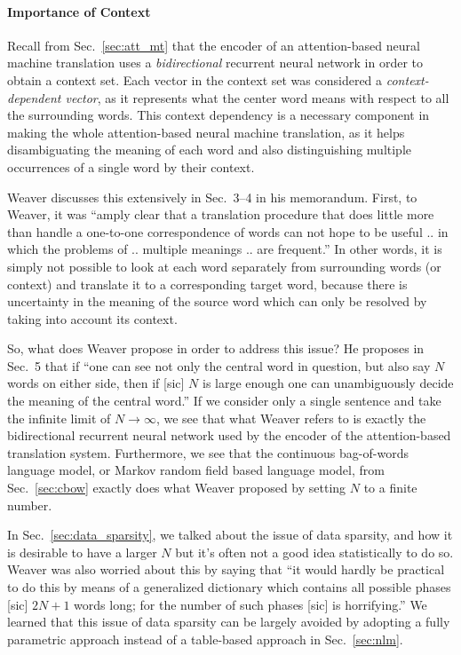 \documentclass{report}
\begin{document}
\paragraph{Importance of Context}

Recall from Sec.~\ref{sec:att_mt} that the encoder of an attention-based neural
machine translation uses a {\em bidirectional} recurrent neural network in order
to obtain a context set. Each vector in the context set was considered a {\em
context-dependent vector}, as it represents what the center word means with
respect to all the surrounding words. This context dependency is a necessary
component in making the whole attention-based neural machine translation, as it
helps disambiguating the meaning of each word and also distinguishing multiple
occurrences of a single word by their context.

Weaver discusses this extensively in Sec.~3--4 in his memorandum. First, to
Weaver, it was ``amply clear that a translation procedure that does little more
than handle a one-to-one correspondence of words can not hope to be useful .. in
which the problems of .. multiple meanings .. are frequent.'' In other words, it
is simply not possible to look at each word separately from surrounding words
(or context) and translate it to a corresponding target word, because there is
uncertainty in the meaning of the source word which can only be resolved by
taking into account its context.

So, what does Weaver propose in order to address this issue? He proposes in
Sec.~5 that if ``one can see not only the central word in question, but also say
$N$ words on either side, then if [sic] $N$ is large enough one can
unambiguously decide the meaning of the central word.'' If we consider only a
single sentence and take the infinite limit of $N \to \infty$, we see that what
Weaver refers to is exactly the bidirectional recurrent neural network used by
the encoder of the attention-based translation system.  Furthermore, we see that
the continuous bag-of-words language model, or Markov random field based
language model, from Sec.~\ref{sec:cbow} exactly does what Weaver proposed by
setting $N$ to a finite number.

In Sec.~\ref{sec:data_sparsity}, we talked about the issue of data sparsity, and
how it is desirable to have a larger $N$ but it's often not a good idea
statistically to do so. Weaver was also worried about this by saying that ``it
would hardly be practical to do this by means of a generalized dictionary which
contains all possible phases [sic] $2N+1$ words long; for the number of such
phases [sic] is horrifying.'' We learned that this issue of data sparsity can be
largely avoided by adopting a fully parametric approach instead of a
table-based approach in Sec.~\ref{sec:nlm}.
\end{document}
